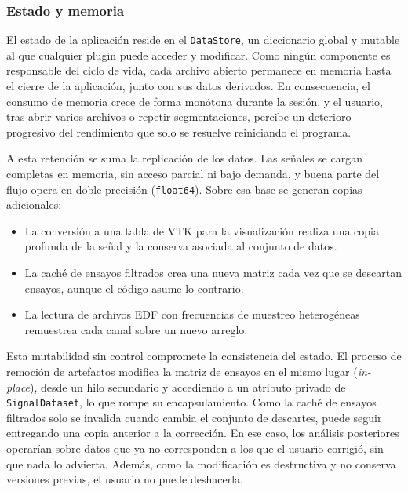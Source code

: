 \documentclass[11pt,a4paper]{article}
\DeclareRobustCommand{\_}{\textunderscore\allowbreak}
\begin{document}
\subsubsection{Estado y memoria}
\label{sec:diag_estado}

El estado de la aplicación reside en el \texttt{DataStore}, un diccionario global y mutable al que cualquier plugin puede acceder y modificar. Como ningún componente es responsable del ciclo de vida, cada archivo abierto permanece en memoria hasta el cierre de la aplicación, junto con sus datos derivados. En consecuencia, el consumo de memoria crece de forma monótona durante la sesión, y el usuario, tras abrir varios archivos o repetir segmentaciones, percibe un deterioro progresivo del rendimiento que solo se resuelve reiniciando el programa.

A esta retención se suma la replicación de los datos. Las señales se cargan completas en memoria, sin acceso parcial ni bajo demanda, y buena parte del flujo opera en doble precisión (\texttt{float64}). Sobre esa base se generan copias adicionales:

\begin{itemize}
    \item La conversión a una tabla de VTK para la visualización realiza una copia profunda de la señal y la conserva asociada al conjunto de datos.
    
    \item La caché de ensayos filtrados crea una nueva matriz cada vez que se descartan ensayos, aunque el código asume lo contrario.
    
    \item La lectura de archivos EDF con frecuencias de muestreo heterogéneas remuestrea cada canal sobre un nuevo arreglo.
\end{itemize}

Esta mutabilidad sin control compromete la consistencia del estado. El proceso de remoción de artefactos modifica la matriz de ensayos en el mismo lugar (\textit{in-place}), desde un hilo secundario y accediendo a un atributo privado de \texttt{SignalDataset}, lo que rompe su encapsulamiento. Como la caché de ensayos filtrados solo se invalida cuando cambia el conjunto de descartes, puede seguir entregando una copia anterior a la corrección. En ese caso, los análisis posteriores operarían sobre datos que ya no corresponden a los que el usuario corrigió, sin que nada lo advierta. Además, como la modificación es destructiva y no conserva versiones previas, el usuario no puede deshacerla.
\end{document}
